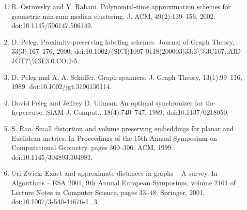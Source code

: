 \begin{enumerate}
\item[]  [44]  R. Ostrovsky and Y. Rabani.  Polynomial-time approximation schemes for geometric min-sum median clustering.  J. ACM, 49(2):139–156, 2002.  doi:10.1145/506147.506149.  
\item[]  [45]  D. Peleg.  Proximity-preserving labeling schemes.  Journal of Graph Theory, 33(3):167–176, 2000.  doi:10.1002/(SICI)1097-0118(200003)33:3\textbackslash{}\%3C167::AID-JGT7\textbackslash{}\%3E3.0.CO;2-5.  
\item[]  [46]  D. Peleg and A. A. Schäffer.  Graph spanners.  J. Graph Theory, 13(1):99–116, 1989.  doi:10.1002/jgt.3190130114.  
\item[]  [47]  David Peleg and Jeffrey D. Ullman.  An optimal synchronizer for the hypercube.  SIAM J. Comput., 18(4):740–747, 1989.  doi:10.1137/0218050.  
\item[]  [48]  S. Rao.  Small distortion and volume preserving embeddings for planar and Euclidean metrics.  In Proceedings of the 15th Annual Symposium on Computational Geometry, pages 300–306. ACM, 1999.  doi:10.1145/304893.304983.  
\item[]  [49]  Uri Zwick.  Exact and approximate distances in graphs – A survey.  In Algorithms – ESA 2001, 9th Annual European Symposium, volume 2161 of Lecture Notes in Computer Science, pages 33–48. Springer, 2001.  doi:10.1007/3-540-44676-1\_3.  
\end{enumerate}
\par
